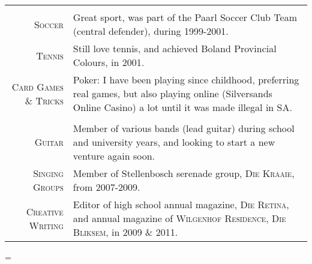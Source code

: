 \documentclass[a4paper,10pt,notitlepage]{article}
\newenvironment{absolutelynopagebreak}
  {\par\nobreak\vfil\penalty0\vfilneg
   \vtop\bgroup}
  {\par\xdef\tpd{\the\prevdepth}\egroup
   \prevdepth=\tpd}
\begin{document}
\begin{absolutelynopagebreak}
\begin{tabular}{r|p{11cm}}
  \multicolumn{2}{c}{}\\
  
 \textsc{Soccer} & Great sport, was part of the Paarl Soccer Club Team (central defender), during 1999-2001. \\
 \textsc{Tennis} & Still love tennis, and achieved Boland Provincial Colours, in 2001. \\
 \textsc{Card Games \& Tricks} & Poker: I have been playing since childhood, preferring real games, but also playing online (Silversands Online Casino) a lot until it was made illegal in SA.\\
 
  \multicolumn{2}{c}{}\\
 
 \textsc{Guitar} & Member of various bands (lead guitar) during school and university years, and looking to start a new venture again soon. \\ 
 \textsc{Singing Groups} & Member of Stellenbosch serenade group, \textsc{Die Kraaie}, from 2007-2009. \\
 \textsc{Creative Writing} & Editor of high school annual magazine, \textsc{Die Retina}, and annual magazine of \textsc{Wilgenhof Residence}, \textsc{Die Bliksem}, in 2009 \& 2011. \\
 
\end{tabular}



\end{absolutelynopagebreak}
\end{document}
